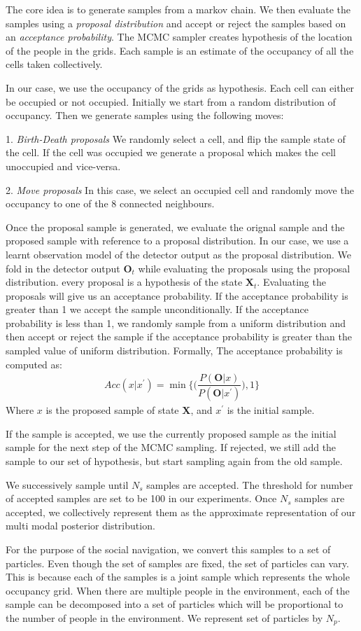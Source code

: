 The core idea is to generate samples from a markov chain. We then evaluate the samples using a \textit{proposal distribution} and accept or reject the samples based on an \textit{acceptance probability}. The MCMC sampler creates hypothesis of the location of the people in the grids. Each sample is an estimate of the occupancy of all the cells taken collectively. 

In our case, we use the occupancy of the grids as hypothesis. Each cell can either be occupied or not occupied. Initially we start from a random distribution of occupancy. Then we generate samples using the following moves:

1. \textit{Birth-Death proposals}
We randomly select a cell, and flip the sample state of the cell. If the cell was occupied we generate a proposal which makes the cell unoccupied and vice-versa.

2. \textit{Move proposals}
In this case, we select an occupied cell and randomly move the occupancy to one of the 8 connected neighbours.

Once the proposal sample is generated, we evaluate the orignal sample and the proposed sample with reference to a proposal distribution. In our case, we use a learnt observation model of the detector output as the proposal distribution. We fold in the detector output $\textbf{O}_{t}$ while evaluating the proposals using the proposal distribution. every proposal is a hypothesis of the state $\textbf{X}_{t}$.
Evaluating the proposals will give us an acceptance probability. If the acceptance probability is greater than 1 we accept the sample unconditionally. If the acceptance probability is less than 1, we randomly sample from a uniform distribution and then accept or reject the sample if the acceptance probability is greater than the sampled value of uniform distribution. Formally,
The acceptance probability is computed as:
\begin{align}
Acc(x|x^{'}) = \min\Big\lbrace\Big(\dfrac{P(\textbf{O}|x)}{P(\textbf{O}|x^{'})}\Big),1\Big\rbrace
\end{align}
Where $x$ is the proposed sample of state \textbf{X}, and $x^{'}$ is the initial sample.

If the sample is accepted, we use the currently proposed sample as the initial sample for the next step of the MCMC sampling. If rejected, we still add the sample to our set of hypothesis, but start sampling again from the old sample.

We successively sample until $N_{s}$ samples are accepted. The threshold for number of accepted samples are set to be 100 in our experiments. Once $N_{s}$ samples are accepted, we collectively represent them as the approximate representation of our multi modal posterior distribution. 

For the purpose of the social navigation, we convert this samples to a set of particles. Even though the set of samples are fixed, the set of particles can vary. This is because each of the samples is a joint sample which represents the whole occupancy grid. When there are multiple people in the environment, each of the sample can be decomposed into a set of particles which will be proportional to the number of people in the environment. We represent set of particles by $N_{p}$. 
